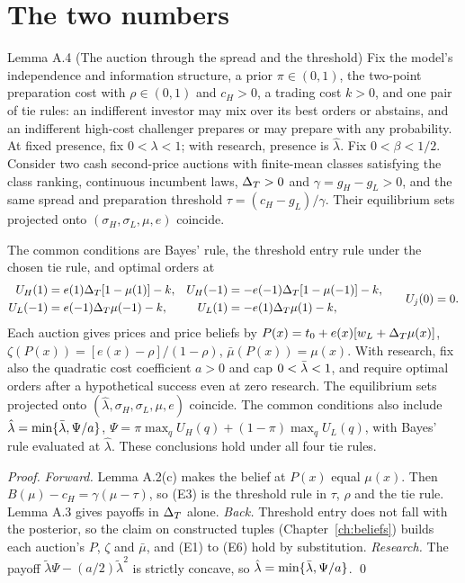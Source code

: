 \section{The two numbers}\label{sec:trading-twonumbers}

\begin{paperresult}{Lemma A.4 (The auction through the spread and the threshold)}
Fix the model's independence and information structure, a prior \(\pi\in(0,1)\), the two-point preparation cost
with \(\rho\in(0,1)\) and \(c_H>0\), a trading cost \(k>0\), and one pair of tie rules: an indifferent investor may
mix over its best orders or abstains, and an indifferent high-cost challenger prepares or may prepare with any
probability. At fixed presence, fix \(0<\lambda<1\); with research, presence is \(\hat\lambda\). Fix
\(0<\beta<1/2\). Consider two cash second-price auctions with finite-mean classes satisfying the class ranking,
continuous incumbent laws, \(\Delta_T>0\) and \(\gamma=g_H-g_L>0\), and the same spread and preparation threshold
\(\tau=(c_H-g_L)/\gamma\). Their equilibrium sets projected onto \((\sigma_H,\sigma_L,\mu,e)\) coincide.

The common conditions are Bayes' rule, the threshold entry rule under the chosen tie rule, and optimal orders at
\[
\begin{aligned}
U_H(1)&=e(1)\Delta_T[1-\mu(1)]-k,& U_H(-1)&=-e(-1)\Delta_T[1-\mu(-1)]-k,\\
U_L(-1)&=e(-1)\Delta_T\mu(-1)-k,& U_L(1)&=-e(1)\Delta_T\mu(1)-k,
\end{aligned}
\qquad U_j(0)=0.
\]
Each auction gives prices and price beliefs by
\(P(x)=t_0+e(x)[w_L+\Delta_T\mu(x)]\), \(\zeta(P(x))=[e(x)-\rho]/(1-\rho)\), \(\bar\mu(P(x))=\mu(x)\).
With research, fix also the quadratic cost coefficient \(a>0\) and cap \(0<\bar\lambda<1\), and require optimal orders
after a hypothetical success even at zero research. The equilibrium sets projected onto
\((\hat\lambda,\sigma_H,\sigma_L,\mu,e)\) coincide. The common conditions also include
\(\hat\lambda=\min\{\bar\lambda,\Psi/a\}\), \(\Psi=\pi\max_q U_H(q)+(1-\pi)\max_q U_L(q)\), with Bayes' rule evaluated at \(\hat\lambda\). These conclusions hold under all four tie rules.
\end{paperresult}

\emph{Proof.} \emph{Forward.} Lemma A.2(c) makes the belief at \(P(x)\) equal
\(\mu(x)\). Then \(B(\mu)-c_H=\gamma(\mu-\tau)\), so (E3) is the threshold rule in \(\tau\), \(\rho\) and the tie
rule. Lemma A.3 gives payoffs in \(\Delta_T\) alone. \emph{Back.} Threshold
entry does not fall with the posterior, so the claim on constructed tuples (Chapter~\ref{ch:beliefs}) builds each
auction's \(P\), \(\zeta\) and \(\bar\mu\), and (E1) to (E6) hold by substitution. \emph{Research.} The payoff
\(\tilde\lambda\Psi-(a/2)\tilde\lambda^2\) is strictly concave, so \(\hat\lambda=\min\{\bar\lambda,\Psi/a\}\). \qed

